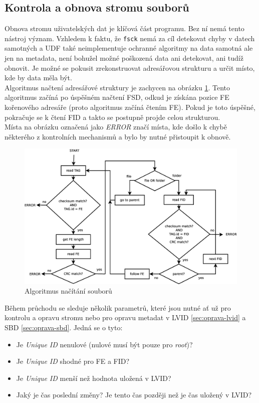 \subsection{Kontrola a obnova stromu souborů}
\label{sec:filetree}
Obnova stromu uživatelských dat je klíčová část programu. Bez ní nemá tento nástroj význam. Vzhledem k faktu, že \texttt{fsck} nemá za cíl detekovat chyby v datech samotných a UDF také neimplementuje ochranné algoritmy na data samotná ale jen na metadata, není bohužel možné poškozená data ani detekovat, ani tudíž obnovit. Je možné se pokusit zrekonstruovat adresářovou strukturu a určit místo, kde by data měla být.\\
Algoritmus načtení adresářové struktury je zachycen na obrázku \ref{fig:files}. Tento algoritmus začíná po úspěšném načtení FSD, odkud je získána pozice FE kořenového adresáře (proto algoritmus začíná čtením FE). Pokud je toto úspěšné, pokračuje se k čtení FID a takto se postupně projde celou strukturou.\\
Místa na obrázku označená jako \textit{ERROR} značí místa, kde došlo k chybě některého z kontrolních mechanismů a bylo by nutné přistoupit k obnově. 
\begin{figure}[ht] 
    \centering
    \includegraphics[scale=0.36]{obrazky/files.eps}
    \caption{Algoritmus načítání souborů}
    \label{fig:files}
\end{figure}
Během průchodu se sleduje několik parametrů, které jsou nutné ať už pro kontrolu a opravu stromu nebo pro opravu metadat v LVID \ref{sec:oprava-lvid} a SBD \ref{sec:oprava-sbd}. Jedná se o tyto:
\begin{itemize}
    \item Je \textit{Unique ID} nenulové (nulové musí být pouze pro \textit{root})?
    \item Je \textit{Unique ID} shodné pro FE a FID?
    \item Je \textit{Unique ID} menší než hodnota uložená v LVID?
    \item Jaký je čas poslední změny? Je tento čas později než je čas uložený v LVID? 
\end{itemize}
